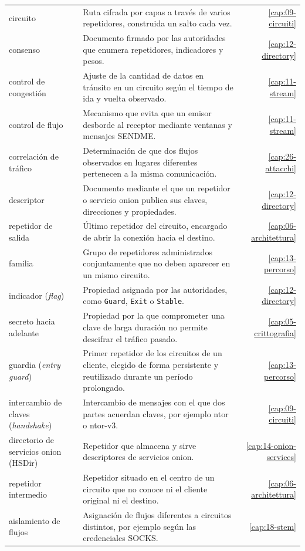 {\begin{longtable}{@{}>{\raggedright\arraybackslash}p{4.1cm}>{\raggedright\arraybackslash}p{8.0cm}r@{}}
circuito & Ruta cifrada por capas a través de varios repetidores, construida un salto cada vez. & \ref{cap:09-circuiti} \\
consenso & Documento firmado por las autoridades que enumera repetidores, indicadores y pesos. & \ref{cap:12-directory} \\
control de congestión & Ajuste de la cantidad de datos en tránsito en un circuito según el tiempo de ida y vuelta observado. & \ref{cap:11-stream} \\
control de flujo & Mecanismo que evita que un emisor desborde al receptor mediante ventanas y mensajes SENDME. & \ref{cap:11-stream} \\
correlación de tráfico & Determinación de que dos flujos observados en lugares diferentes pertenecen a la misma comunicación. & \ref{cap:26-attacchi} \\
descriptor & Documento mediante el que un repetidor o servicio onion publica sus claves, direcciones y propiedades. & \ref{cap:12-directory} \\
repetidor de salida & Último repetidor del circuito, encargado de abrir la conexión hacia el destino. & \ref{cap:06-architettura} \\
familia & Grupo de repetidores administrados conjuntamente que no deben aparecer en un mismo circuito. & \ref{cap:13-percorso} \\
indicador (\emph{flag}) & Propiedad asignada por las autoridades, como \texttt{Guard}, \texttt{Exit} o \texttt{Stable}. & \ref{cap:12-directory} \\
secreto hacia adelante & Propiedad por la que comprometer una clave de larga duración no permite descifrar el tráfico pasado. & \ref{cap:05-crittografia} \\
guardia (\emph{entry guard}) & Primer repetidor de los circuitos de un cliente, elegido de forma persistente y reutilizado durante un período prolongado. & \ref{cap:13-percorso} \\
intercambio de claves (\emph{handshake}) & Intercambio de mensajes con el que dos partes acuerdan claves, por ejemplo ntor o ntor-v3. & \ref{cap:09-circuiti} \\
directorio de servicios onion (HSDir) & Repetidor que almacena y sirve descriptores de servicios onion. & \ref{cap:14-onion-services} \\
repetidor intermedio & Repetidor situado en el centro de un circuito que no conoce ni el cliente original ni el destino. & \ref{cap:06-architettura} \\
aislamiento de flujos & Asignación de flujos diferentes a circuitos distintos, por ejemplo según las credenciales SOCKS. & \ref{cap:18-stem} \\

\end{longtable}}
